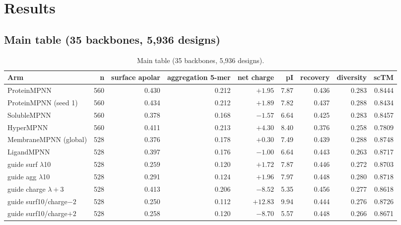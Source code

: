 \section{Results}
\label{sec:results}

\subsection{Main table (35 backbones, 5,936 designs)}
\label{sec:main-table}

\setcounter{figure}{1}

\begin{table}[htbp]
  \centering
  \scriptsize
  \setlength{\tabcolsep}{2pt}
  \begin{tabular}{@{}lrrrrrrrr@{}}
    \toprule
    Arm & n & surface apolar & aggregation 5-mer & net charge & pI & recovery & diversity & \textbf{scTM} \\
    \midrule
    ProteinMPNN & 560 & 0.430 & 0.212 & $+1.95$ & 7.87 & 0.436 & 0.283 & 0.8444 \\
    ProteinMPNN (seed 1) & 560 & 0.434 & 0.212 & $+1.89$ & 7.82 & 0.437 & 0.288 & 0.8434 \\
    SolubleMPNN & 560 & 0.378 & 0.168 & $-1.57$ & 6.64 & 0.425 & 0.283 & 0.8457 \\
    HyperMPNN & 560 & 0.411 & 0.213 & $+4.30$ & 8.40 & $\bm{0.376}$ & 0.258 & $\bm{0.7809}$ \\
    MembraneMPNN (global) & 528 & 0.376 & 0.178 & $+0.30$ & 7.49 & 0.439 & 0.288 & 0.8748 \\
    LigandMPNN & 528 & 0.397 & 0.176 & $-1.00$ & 6.64 & 0.443 & 0.263 & 0.8717 \\
    guide surf $\lambda$10 & 528 & $\bm{0.259}$ & 0.120 & $+1.72$ & 7.87 & 0.446 & 0.272 & 0.8703 \\
    guide agg $\lambda$10 & 528 & 0.291 & $\bm{0.124}$ & $\bm{+1.96}$ & 7.97 & 0.448 & 0.280 & $\bm{0.8718}$ \\
    guide charge $\lambda{+}3$ & 528 & 0.413 & 0.206 & $\bm{-8.52}$ & 5.35 & 0.456 & 0.277 & 0.8618 \\
    guide surf10/charge$-2$ & 528 & 0.250 & 0.112 & $\bm{+12.83}$ & 9.94 & 0.444 & 0.276 & 0.8726 \\
    guide surf10/charge$+2$ & 528 & 0.258 & 0.120 & $\bm{-8.70}$ & 5.57 & 0.448 & 0.266 & 0.8671 \\
    \bottomrule
  \end{tabular}
  \caption{Main table (35 backbones, 5{,}936 designs).}
  \label{tab:main}
\end{table}

